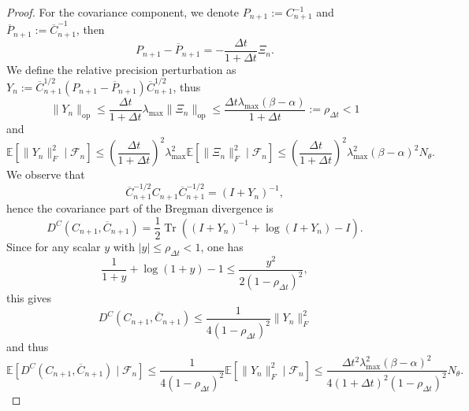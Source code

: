 \documentclass[11pt]{article}
\theoremstyle{plain}
\theoremstyle{definition}
\theoremstyle{remark}
\newcommand{\E}{\mathbb{E}}
\newcommand{\Tr}{\operatorname{Tr}}
\begin{document}
\begin{proof}
    For the covariance component, we denote $P_{n+1} := C_{n+1}^{-1}$ and $\overline{P}_{n+1} := \overline{C}_{n+1}^{-1}$, then
    \begin{equation*}
        P_{n+1} - \overline{P}_{n+1} = -\frac{\Delta t}{1 + \Delta t} \Xi_n.
    \end{equation*}
    We define the relative precision perturbation as $Y_n := \overline{C}_{n+1}^{1/2} (P_{n+1} - \overline{P}_{n+1}) \overline{C}_{n+1}^{1/2}$, thus
    \begin{equation*}
        \|Y_n\|_\mathrm{op} \leq \frac{\Delta t }{1 + \Delta t} \lambda_{\max} \| \Xi_n\|_\mathrm{op} \leq \frac{\Delta t \lambda_{\max} (\beta - \alpha)}{1 + \Delta t} := \rho_{\Delta t} < 1
    \end{equation*}
    and \begin{equation*}
        \E [\|Y_n\|_F^2 \mid \mathcal{F}_n] \leq \left( \frac{\Delta t}{1 + \Delta t} \right)^2 \lambda_{\max}^2 \E [\| \Xi_n\|_F^2 \mid \mathcal{F}_n] \leq \left( \frac{\Delta t}{1 + \Delta t} \right)^2 \lambda_{\max}^2 (\beta - \alpha)^2 N_\theta.
    \end{equation*}
    We observe that 
    \begin{equation*}
        \overline{C}_{n+1}^{-1/2} C_{n+1} \overline{C}_{n+1}^{-1/2} = (I + Y_n)^{-1},
    \end{equation*}
    hence the covariance part of the Bregman divergence is
    \begin{equation*}
        D^C (C_{n+1}, \overline{C}_{n+1}) = \frac{1}{2} \Tr ((I + Y_n)^{-1} + \log (I + Y_n) - I).
    \end{equation*}
    Since for any scalar $y$ with $|y| \leq \rho_{\Delta t} < 1$, one has
    \begin{equation*}
        \frac{1}{1 + y} + \log (1 + y) - 1 \leq \frac{y^2}{2 (1 - \rho_{\Delta t})^2},
    \end{equation*}
    this gives
    \begin{equation*}
        D^C (C_{n+1}, \overline{C}_{n+1}) \le \frac{1}{4 (1 - \rho_{\Delta t})^2} \|Y_n\|_F^2
    \end{equation*}
    and thus
    \begin{equation*}
        \E[D^C (C_{n+1}, \overline{C}_{n+1}) \mid \mathcal{F}_n] \leq \frac{1}{4 (1 - \rho_{\Delta t})^2} \E[\|Y_n\|_F^2 \mid \mathcal{F}_n] \leq \frac{\Delta t^2 \lambda_{\max}^2 (\beta - \alpha)^2}{4 (1 + \Delta t)^2 (1 - \rho_{\Delta t})^2} N_\theta.
    \end{equation*}


\end{proof}
\end{document}
